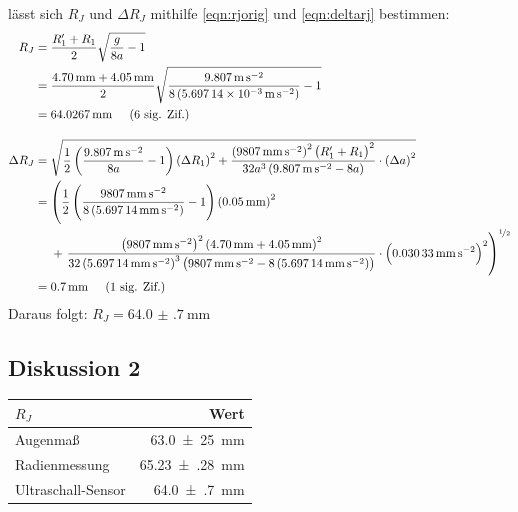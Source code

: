             lässt sich $R_J$ und $\Delta R_J$ mithilfe \eqref{eqn:rjorig} und \eqref{eqn:deltarj} bestimmen:
            \begin{align}
                R_{J} &= \frac{R_1' + R_1}{2}\sqrt{\frac{g}{8a}-1} \notag \\
                &= \frac{\SI{4,70}{\milli\meter} + \SI{4,05}{\milli\meter}}{2}\sqrt{\frac{\SI{9.807}{\meter\per\second\squared}}{8\left(\SI{5.69714e-3}{\meter\per\second\squared}\right)}-1} \notag \\
                &= \SI{64.0267}{\milli\meter} \hspace{0.5cm}\text{(6 sig. Zif.)} \\[1em]
                \Delta R_J &= \sqrt{\frac{1}{2}\left(\frac{\SI{9.807}{\meter\per\second\squared}}{8a} -1\right)\left(\Delta R_1\right)^2 + \frac{\left(\SI{9807}{\milli\meter\per\second\squared}\right)^2\left(R_1' + R_1\right)^2}{32a^3\left(\SI{9.807}{\meter\per\second\squared}-8a\right)}\cdot\left(\Delta a\right)^2} \notag \\
                &= \left(\frac{1}{2}\left(\frac{\SI{9807}{\milli\meter\per\second\squared}}{8\left(\SI{5.69714}{\milli\meter\per\second\squared}\right)} -1\right)\left(\SI{0.05}{\milli\meter}\right)^2 \right. \notag \\
                &~~~~+ \left. \frac{\left(\SI{9807}{\milli\meter\per\second\squared}\right)^2\left(\SI{4,70}{\milli\meter} + \SI{4,05}{\milli\meter}\right)^2}{32\left(\SI{5.69714}{\milli\meter\per\second\squared}\right)^3\left(\SI{9807}{\milli\meter\per\second\squared}-8\left(\SI{5.69714}{\milli\meter\per\second\squared}\right)\right)}\cdot\left(\SI{0,03033}{\milli\meter\per\second\squared}\right)^2\right)^{\nicefrac{1}{2}} \notag \\
                &= \SI{0.7}{\milli\meter} \hspace{0.5cm}\text{(1 sig. Zif.)}
            \end{align} %
            Daraus folgt: $R_J = \SI{64.0(7)}{\milli\meter}$

    \newpage
    \subsection{Diskussion 2}
        \begin{center}
            \begin{tabular} {lr}
                \toprule
                $R_J$ & Wert \\
                \midrule
                Augenmaß & \SI{63,0(25)}{\milli\meter} \\
                Radienmessung & \SI{65.23(28)}{\milli\meter} \\
                Ultraschall-Sensor & \SI{64.0(7)}{\milli\meter} \\
                \bottomrule
            \end{tabular}
        \end{center}

